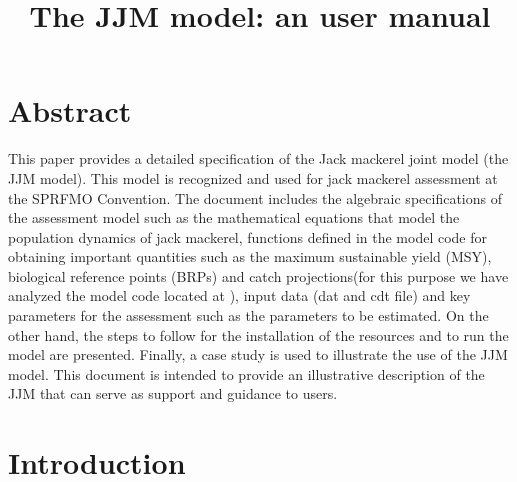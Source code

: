 \documentclass{article}
\title{The JJM model: an user manual}
\date{\parbox{\linewidth}{\centering%
  \skip
  Mirian GERONIMO \hspace*{3cm} Criscely LUJAN \endgraf\medskip
  Instituto del Mar del Perú (IMARPE)}
  }
\begin{document}
\maketitle
\tableofcontents
\newpage

\section*{Abstract} 


This paper provides a detailed specification of the Jack mackerel joint model (the JJM model). This model is recognized and used for jack mackerel assessment at the SPRFMO Convention. The document includes the algebraic specifications of the assessment model such as the mathematical equations that model the population dynamics of jack mackerel, functions defined in the model code for obtaining important quantities such as  the maximum sustainable yield (MSY),  biological reference points (BRPs) and catch projections(for this purpose we have analyzed the model code located at  \cite{codejjm}), input data (dat and cdt file) and key parameters for the assessment such as the parameters to be estimated. On the other hand, the steps to follow for the installation of the resources and to run the model are presented. Finally, a case study is used to illustrate the use of the JJM model. This document is intended to provide an illustrative description of the JJM that can serve as support and guidance to users.

\section{Introduction} 
\end{document}
